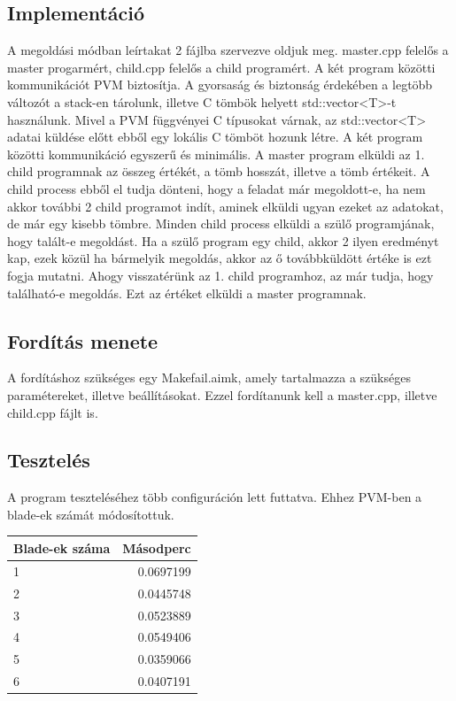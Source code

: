 \documentclass[12pt]{article}
\begin{document}
\subsection{Implementáció}

A megoldási módban leírtakat 2 fájlba szervezve oldjuk meg. master.cpp felelős a master progarmért, child.cpp felelős a child programért. A két program közötti kommunikációt PVM biztosítja. A gyorsaság és biztonság érdekében a legtöbb változót a stack-en tárolunk, illetve C tömbök helyett std::vector<T>-t használunk. Mivel a PVM függvényei C típusokat várnak, az std::vector<T> adatai küldése előtt ebből egy lokális C tömböt hozunk létre. A két program közötti kommunikáció egyszerű és minimális. A master program elküldi az 1. child programnak az összeg értékét, a tömb hosszát, illetve a tömb értékeit. A child process ebből el tudja dönteni, hogy a feladat már megoldott-e, ha nem akkor további 2 child programot indít, aminek elküldi ugyan ezeket az adatokat, de már egy kisebb tömbre. Minden child process elküldi a szülő programjának, hogy talált-e megoldást. Ha a szülő program egy child, akkor 2 ilyen eredményt kap, ezek közül ha bármelyik megoldás, akkor az ő továbbküldött értéke is ezt fogja mutatni. Ahogy visszatérünk az 1. child programhoz, az már tudja, hogy található-e megoldás. Ezt az értéket elküldi a master programnak.

\subsection{Fordítás menete}

A fordításhoz szükséges egy Makefail.aimk, amely tartalmazza a szükséges paramétereket, illetve beállításokat. Ezzel fordítanunk kell a master.cpp, illetve child.cpp fájlt is.

\subsection{Tesztelés}

A program teszteléséhez több configuráción lett futtatva. Ehhez PVM-ben a blade-ek számát módosítottuk.

\begin{tabular}{ l r }
	Blade-ek száma & Másodperc \\ \hline
	1  &  0.0697199  \\
	2  &  0.0445748  \\
	3  &  0.0523889  \\
	4  &  0.0549406  \\
	5  &  0.0359066  \\
	6  &  0.0407191  \\
\end{tabular}
\end{document}
